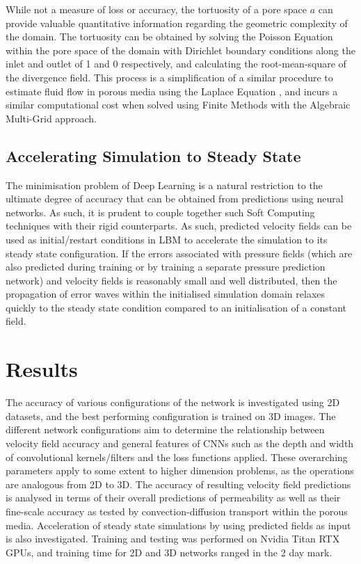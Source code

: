 \documentclass{article}
\begin{document}
While not a measure of loss or accuracy, the tortuosity of a pore space $a$ can provide valuable quantitative information regarding the geometric complexity of the domain. The tortuosity can be obtained by solving the Poisson Equation within the pore space of the domain \cite{tortuosity} with Dirichlet boundary conditions along the inlet and outlet of 1 and 0 respectively, and calculating the root-mean-square of the divergence field. This process is a simplification of a similar procedure to estimate fluid flow in porous media using the Laplace Equation \cite{pfvs}, and incurs a similar computational cost when solved using Finite Methods with the Algebraic Multi-Grid approach.


\subsection{Accelerating Simulation to Steady State}
\label{sec:acceleratingPerm}

The minimisation problem of Deep Learning is a natural restriction to the ultimate degree of accuracy that can be obtained from predictions using neural networks. As such, it is prudent to couple together such Soft Computing techniques with their rigid counterparts. As such, predicted velocity fields can be used as initial/restart conditions in LBM to accelerate the simulation to its steady state configuration. If the errors associated with pressure fields (which are also predicted during training or by training a separate pressure prediction network) and velocity fields is reasonably small and well distributed, then the propagation of error waves within the initialised simulation domain relaxes quickly to the steady state condition compared to an initialisation of a constant field. 

\section{Results}
\label{sec:results}
The accuracy of various configurations of the network is investigated using 2D datasets, and the best performing configuration is trained on 3D images. The different network configurations aim to determine the relationship between velocity field accuracy and general features of CNNs such as the depth and width of convolutional kernels/filters and the loss functions applied. These overarching parameters apply to some extent to higher dimension problems, as the operations are analogous from 2D to 3D. The accuracy of resulting velocity field predictions is analysed in terms of their overall predictions of permeability as well as their fine-scale accuracy as tested by convection-diffusion transport within the porous media. Acceleration of steady state simulations by using predicted fields as input is also investigated. Training and testing was performed on Nvidia Titan RTX GPUs, and training time for 2D and 3D networks ranged in the 2 day mark.
\end{document}
